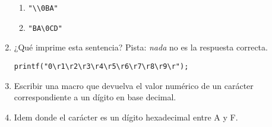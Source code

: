 \begin{enumerate}
\begin{enumerate}[label=\alph*.]
\item \lstinline{"\\0BA"}
\item \lstinline{"BA\0CD"}
	\end{enumerate}
\item ¿Qué imprime esta sentencia? Pista: \textit{nada} no es la respuesta correcta.
\begin{lstlisting}
printf("0\r1\r2\r3\r4\r5\r6\r7\r8\r9\r");
\end{lstlisting}
\item Escribir una macro que devuelva el valor numérico de un carácter correspondiente a un dígito en base decimal.
\item Idem donde el carácter es un dígito hexadecimal entre A y F.
\end{enumerate}

